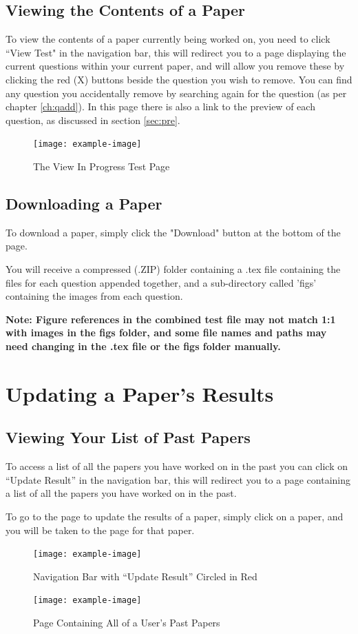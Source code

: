 \documentclass[12pt, a4paper, titlepage]{book}
\begin{document}
\section{Viewing the Contents of a Paper}
To view the contents of a paper currently being worked on, you need to click ``View Test" in the navigation bar, this will redirect you to a page displaying the current questions within your current paper, and will allow you remove these by clicking the red (X) buttons beside the question you wish to remove. You can find any question you accidentally remove by searching again for the question (as per chapter \ref{ch:qadd}). In this page there is also a link to the preview of each question, as discussed in section \ref{sec:pre}.\par
\begin{figure}[htp]
\centering
\texttt{[image: example-image]}
\caption{The View In Progress Test Page}
\end{figure}

\section{Downloading a Paper}
To download a paper, simply click the "Download" button at the bottom of the page. \par You will receive a compressed (.ZIP) folder containing a .tex file containing the files for each question appended together, and a sub-directory called 'figs' containing the images from each question.
\par \textbf{Note: Figure references in the combined test file may not match 1:1 with images in the figs folder, and some file names and paths may need changing in the .tex file or the figs folder manually.}


\chapter{Updating a Paper's Results}\label{ch:upres}
\section{Viewing Your List of Past Papers}
To access a list of all the papers you have worked on in the past you can click on ``Update Result'' in the navigation bar, this will redirect you to a page containing a list of all the papers you have worked on in the past.\par To go to the page to update the results of a paper, simply click on a paper, and you will be taken to the page for that paper.
\begin{figure}[htp]
\centering
\texttt{[image: example-image]}
\caption{Navigation Bar with ``Update Result'' Circled in Red}
\end{figure}
\begin{figure}[H]
\centering
\texttt{[image: example-image]}
\caption{Page Containing All of a User's Past Papers}
\end{figure}
\end{document}
